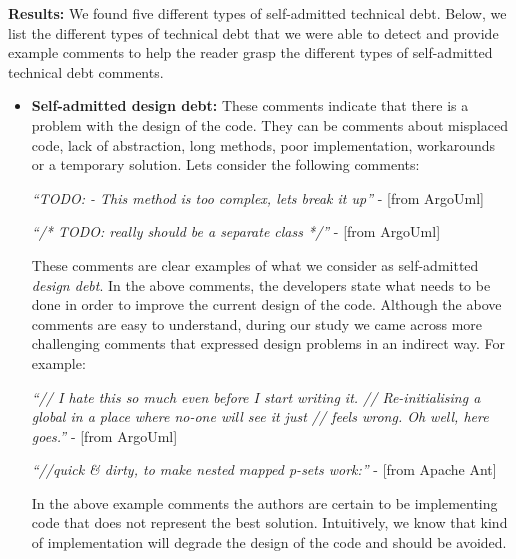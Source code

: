 \vspace{1mm}
\noindent\textbf{Results:} We found five different types of self-admitted technical debt. Below, we list the different types of technical debt that we were able to detect and provide example comments to help the reader grasp the different types of self-admitted technical debt comments.


\begin{itemize}
  \item \textbf{Self-admitted design debt:} These comments indicate that there is a problem with the design of the code. They can be comments about misplaced code, lack of abstraction, long methods, poor implementation, workarounds or a temporary solution. Lets consider the following comments:
  
  \vspace{1mm}
  \begin{displayquote}
     \textit{``TODO: - This method is too complex, lets break it up''} - [from ArgoUml]
     
     \vspace{1mm}

     \textit{``/* TODO: really should be a separate class */''} - [from ArgoUml]
  \end{displayquote}
  \vspace{1mm}

These comments are clear examples of what we consider as self-admitted \emph{design debt}. In the above comments, the developers state what needs to be done in order to improve the current design of the code. Although the above comments are easy to understand, during our study we came across more challenging comments that expressed design problems in an indirect way. For example: 
  
  \vspace{1mm}
  \begin{displayquote}
     \textit{``// I hate this so much even before I start writing it. // Re-initialising a global in a place where no-one will see it just // feels wrong.  Oh well, here goes.''} - [from ArgoUml]

     \vspace{1mm}

     \textit{``//quick \& dirty, to make nested mapped p-sets work:''} - [from Apache Ant]
  \end{displayquote}
  \vspace{1mm}

In the above example comments the authors are certain to be implementing code that does not represent the best solution. Intuitively, we know that kind of implementation will degrade the design of the code and should be avoided. 


\end{itemize}
